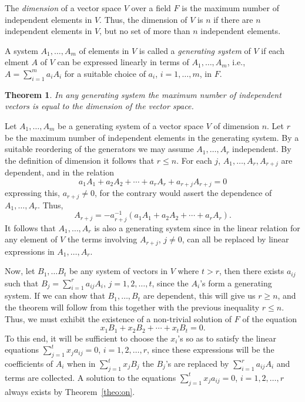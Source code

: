 \documentclass[11pt]{article}
\newtheorem{theo}{Theorem}
\theoremstyle{definition}
\begin{document}
The \emph{dimension} of a vector space $V$ over a field $F$ is the maximum number of independent elements in $V$. Thus, the dimension of $V$ is $n$ if there are $n$ independent elements in $V$, but no set of more than $n$ independent elements.

A system $A_1, \ldots, A_m$ of elements in $V$ is called a \emph{generating system} of $V$ if each elment $A$ of $V$ can be expressed linearly in terms of $A_1, \ldots, A_m$, i.e., $A = \sum_{i = 1}^m a_i A_i$ for a suitable choice of $a_i$, $i = 1,\ldots, m$, in $F$.


\begin{theo}
\label{theo:tw}
In any generating system the maximum number of independent vectors is equal to the dimension of the vector space.
\end{theo}

Let $A_1, \ldots, A_m$ be a generating system of a vector space $V$ of dimension $n$.
Let $r$ be the maximum number of independent elements in the generating system.
By a suitable reordering of the generators we may assume $A_1, \dots, A_r$ independent.
By the definition of dimension it follows that $r \leq n$.
For each $j$, $A_1, \ldots, A_r, A_{r+j}$ are dependent, and in the relation
\[
a_1 A_1 + a_2 A_2 + \cdots + a_r A_r + a_{r+j} A_{r+j} = 0
\]
expressing this, $a_{r+j} \not=0$, for the contrary would assert the dependence of $A_1, \ldots, A_r$.
Thus,
\[
A_{r+j} = -a_{r+j}^{-1}(a_1 A_1 + a_2 A_2 + \cdots + a_r A_r).
\]
It follows that $A_1, \ldots, A_r$ is also a generating system since in the linear relation for any element of $V$ the terms involving $A_{r+j}$, $j\not=0$, can all be replaced by linear expressions in $A_1, \ldots, A_r$.

Now, let $B_1, \ldots B_t$ be any system of vectors in $V$ where $t > r$, then there exists $a_{ij}$ such that $B_j = \sum_{i=1}^r a_{ij} A_i$, $j=1,2,\dots,t$, since the $A_i$'s form a generating system.
If we can show that $B_1, \ldots, B_t$ are dependent, this will give us $r \geq n$, and the theorem will follow from this together with the previous inequality $r \leq n$.
Thus, we must exhibit the existence of a non-trivial solution of $F$ of the equation
\[
x_1 B_1 + x_2 B_2 + \cdots + x_t B_t = 0.
\]
To this end, it will be sufficient to choose the $x_i$'s so as to satisfy the linear equations $\sum_{j=1}^t x_j a_{ij} = 0$, $i = 1,2,\dots,r$, since these expressions will be the coefficients of $A_i$ when in $\sum_{j=1}^t x_j B_j$ the $B_j$'s are replaced by $\sum_{i=1}^r a_{ij} A_i$ and terms are collected.
A solution to the equations $\sum_{j=1}^t x_j a_{ij} = 0$, $i = 1,2,\ldots,r$ always exists by Theorem~\ref{theo:on}.
\end{document}
